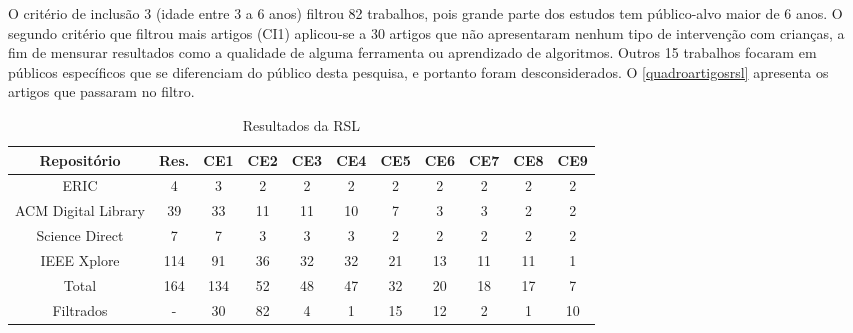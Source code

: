 {\begin{quadro}[!htbp]
\begin{tabular}{|p{}|p{}|}
 \\ \hline
 
 \end{tabular}
\end{quadro}

O critério de inclusão 3 (idade entre 3 a 6 anos) filtrou 82 trabalhos, pois grande parte dos estudos tem público-alvo maior de 6 anos. O segundo critério que filtrou mais artigos (CI1) aplicou-se a 30 artigos que não apresentaram nenhum tipo de intervenção com crianças, a fim de mensurar resultados como a qualidade de alguma ferramenta ou aprendizado de algoritmos. Outros 15 trabalhos focaram em públicos específicos que se diferenciam do público desta pesquisa, e portanto foram desconsiderados. O \autoref{quadroartigosrsl} apresenta os artigos que passaram no filtro.

\begin{table}[!htbp]
    \begin{center}
    \begin{footnotesize}
    \caption{Resultados da RSL}
    \label{rsl_table}

    \begin{tabular}{|c|c|c|c|c|c|c|c|c|c|c|} \hline
        Repositório         & Res. & CE1 & CE2 & CE3 & CE4 & CE5 & CE6 & CE7 & CE8 & CE9 \\ \hline
        ERIC                & 4  &  3  &  2 &  2 &  2 &  2 & 2  &  2 &  2 & 2  \\ \hline
        ACM Digital Library & 39 & 33  & 11 & 11 & 10 &  7 & 3  &  3 &  2 & 2  \\ \hline
        Science Direct      &  7 &  7  &  3 &  3 &  3 &  2 & 2  &  2 &  2 & 2  \\ \hline
        IEEE Xplore        & 114 & 91  & 36 & 32 & 32 & 21 & 13 & 11 & 11 & 1  \\ \hline
        Total              & 164 & 134 & 52 & 48 & 47 & 32 & 20 & 18 & 17 & 7  \\ \hline 
        Filtrados          & -   &  30 & 82 &  4 &  1 & 15 & 12 &  2 & 1  & 10 \\ \hline 
    \end{tabular}
    
    \end{footnotesize}
    \end{center}
    \sourceauthor
\end{table}

\begin{landscape}
\linespread{1}
\begin{footnotesize}
\begin{quadro}
 \label{quadroartigosrsl}
\end{quadro}
\begin{longtable}{|p{6cm}|p{8cm}|p{8cm}|}
    \hline
    

\end{longtable}
\end{footnotesize}
\end{landscape}}
